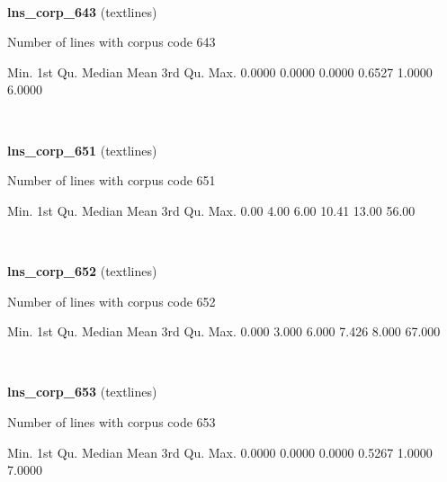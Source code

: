 \documentclass[]{article}
\newenvironment{Shaded}{\begin{snugshade}}{\end{snugshade}}
\newcommand{\FloatTok}[1]{\textcolor[rgb]{0.00,0.00,0.81}{{#1}}}
\newcommand{\NormalTok}[1]{{#1}}
\begin{document}
~

\vspace{1em}

\textbf{lns\_corp\_643} (textlines)

Number of lines with corpus code 643

\begin{Shaded}
\begin{Highlighting}[]
   \NormalTok{Min. 1st Qu.  Median    Mean 3rd Qu.    Max. }
 \FloatTok{0.0000}  \FloatTok{0.0000}  \FloatTok{0.0000}  \FloatTok{0.6527}  \FloatTok{1.0000}  \FloatTok{6.0000} 
\end{Highlighting}
\end{Shaded}

~

\vspace{1em}

\textbf{lns\_corp\_651} (textlines)

Number of lines with corpus code 651

\begin{Shaded}
\begin{Highlighting}[]
   \NormalTok{Min. 1st Qu.  Median    Mean 3rd Qu.    Max. }
   \FloatTok{0.00}    \FloatTok{4.00}    \FloatTok{6.00}   \FloatTok{10.41}   \FloatTok{13.00}   \FloatTok{56.00} 
\end{Highlighting}
\end{Shaded}

~

\vspace{1em}

\textbf{lns\_corp\_652} (textlines)

Number of lines with corpus code 652

\begin{Shaded}
\begin{Highlighting}[]
   \NormalTok{Min. 1st Qu.  Median    Mean 3rd Qu.    Max. }
  \FloatTok{0.000}   \FloatTok{3.000}   \FloatTok{6.000}   \FloatTok{7.426}   \FloatTok{8.000}  \FloatTok{67.000} 
\end{Highlighting}
\end{Shaded}

~

\vspace{1em}

\textbf{lns\_corp\_653} (textlines)

Number of lines with corpus code 653

\begin{Shaded}
\begin{Highlighting}[]
   \NormalTok{Min. 1st Qu.  Median    Mean 3rd Qu.    Max. }
 \FloatTok{0.0000}  \FloatTok{0.0000}  \FloatTok{0.0000}  \FloatTok{0.5267}  \FloatTok{1.0000}  \FloatTok{7.0000} 
\end{Highlighting}
\end{Shaded}
\end{document}
